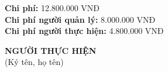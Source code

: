 {\begin{minipage}{\textwidth}
    \vspace{0.5cm}
    \noindent \textbf{Chi phí:} 12.800.000 VNĐ \\
    \noindent \textbf{Chi phí người quản lý:} 8.000.000 VNĐ \\
    \noindent \textbf{Chi phí người thực hiện:} 4.800.000 VNĐ \\
    \vspace{1cm}
    \begin{flushleft}
        \hspace{8cm} \textbf{NGƯỜI THỰC HIỆN} \\
        \hspace{8.8cm} (Ký tên, họ tên) \\
        \vspace{1cm}
    \end{flushleft}
    \end{minipage}
}
% 
